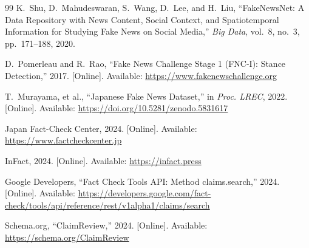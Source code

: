 \documentclass[twoside]{llncs}
\begin{document}
\begin{thebibliography}{99}
K.~Shu, D.~Mahudeswaran, S.~Wang, D.~Lee, and H.~Liu, ``FakeNewsNet: A Data Repository with News Content, Social Context, and Spatiotemporal Information for Studying Fake News on Social Media,'' \emph{Big Data}, vol.~8, no.~3, pp.~171--188, 2020.

D.~Pomerleau and R.~Rao, ``Fake News Challenge Stage 1 (FNC-I): Stance Detection,'' 2017. [Online]. Available: \url{https://www.fakenewschallenge.org}

T.~Murayama, et al., ``Japanese Fake News Dataset,'' in \emph{Proc. LREC}, 2022. [Online]. Available: \url{https://doi.org/10.5281/zenodo.5831617}

Japan Fact-Check Center, 2024. [Online]. Available: \url{https://www.factcheckcenter.jp}

InFact, 2024. [Online]. Available: \url{https://infact.press}

Google Developers, ``Fact Check Tools API: Method claims.search,'' 2024. [Online]. Available: \url{https://developers.google.com/fact-check/tools/api/reference/rest/v1alpha1/claims/search}

Schema.org, ``ClaimReview,'' 2024. [Online]. Available: \url{https://schema.org/ClaimReview}

\end{thebibliography}
\end{document}
